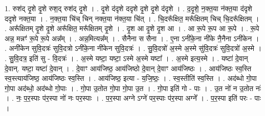 \documentclass[17pt]{extarticle}
\begin{document}
1. रुश॑द् दृ॒शे दृ॒शे रुश॒द् रुश॑द् दृ॒शे । . दृ॒शे द॑दृशे ददृशे दृ॒शे दृ॒शे द॑दृशे । . द॒दृ॒शे॒ न॒क्त॒या न॑क्त॒या द॑दृशे ददृशे नक्त॒या । . न॒क्त॒या चि॑च् चिन् नक्त॒या न॑क्त॒या चि॑त् । . चि॒दरू᳚क्षित॒ मरू᳚क्षितम् चिच् चि॒दरू᳚क्षितम् । . अरू᳚क्षितम् दृ॒शे दृ॒शे अरू᳚क्षित॒ मरू᳚क्षितम् दृ॒शे । . दृ॒श आ दृ॒शे दृ॒श आ । . आ रू॒पे रू॒प आ रू॒पे । . रू॒पे अन्न॒ मन्नꣳ॑ रू॒पे रू॒पे अन्न᳚म् । . अन्न॒मित्यन्न᳚म् । . सैनैना स सैना । . ए॒ना ऽनी॑के॒ना नी॑के नै॒नैना ऽनी॑केन । . अनी॑केन सुवि॒दत्रः॑ सुवि॒दत्रो ऽनी॑के॒ना नी॑केन सुवि॒दत्रः॑ । . सु॒वि॒दत्रो॑ अ॒स्मे अ॒स्मे सु॑वि॒दत्रः॑ सुवि॒दत्रो॑ अ॒स्मे । . सु॒वि॒दत्र॒ इति॑ सु - वि॒दत्रः॑ । . अ॒स्मे यष्टा॒ यष्टा॒ ऽस्मे अ॒स्मे यष्टा᳚ । . अ॒स्मे इत्य॒स्मे । . यष्टा॑ दे॒वान् दे॒वान्. यष्टा॒ यष्टा॑ दे॒वान् । . दे॒वाꣳ आय॑जिष्ठ॒ आय॑जिष्ठो दे॒वान् दे॒वाꣳ आय॑जिष्ठः । . आय॑जिष्ठः स्व॒स्ति स्व॒स्त्याय॑जिष्ठ॒ आय॑जिष्ठः स्व॒स्ति । . आय॑जिष्ठ॒ इत्या - य॒जि॒ष्ठः॒ । . स्व॒स्तीति॑ स्व॒स्ति । . अद॑ब्धो गो॒पा गो॒पा अद॑ब्धो॒ अद॑ब्धो गो॒पाः । . गो॒पा उ॒तोत गो॒पा गो॒पा उ॒त । . गो॒पा इति॑ गो - पाः । . उ॒त नो॑ न उ॒तोत नः॑ । . नः॒ प॒र॒स्पाः प॑र॒स्पा नो॑ नः पर॒स्पाः । . प॒र॒स्पा अग्ने ऽग्ने॑ पर॒स्पाः प॑र॒स्पा अग्ने᳚ । . प॒र॒स्पा इति॑ परः - पाः । \newline
\end{document}

